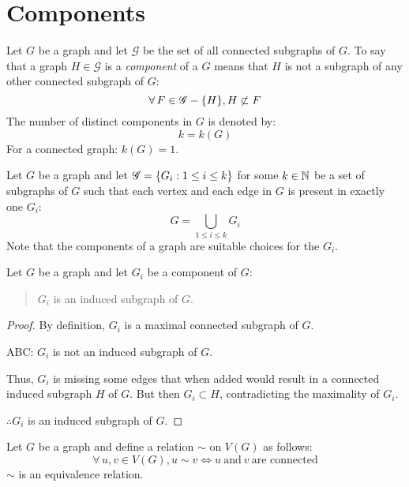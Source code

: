 \documentclass[letterpaper,12pt,fleqn]{article}
\newcommand{\G}{\mathscr{G}}
\begin{document}
\section*{Components}

\begin{definition}[Component]
  Let \(G\) be a graph and let \(\G\) be the set of all connected subgraphs of \(G\).  To say that a graph \(H\in\G\)
  is a \emph{component} of a \(G\) means that \(H\) is not a subgraph of any other connected subgraph of \(G\):
  \[\forall\,F\in\G-\set{H},H\not\subset F\]
  The number of distinct components in \(G\) is denoted by:
  \[k=k(G)\]
  For a connected graph: \(k(G)=1\).
\end{definition}

\begin{notation}[Union]
  Let \(G\) be a graph and let \(\G=\set{G_i:1\le i\le k}\) for some \(k\in\mathbb{N}\) be a set of subgraphs of \(G\) such
  that each vertex and each edge in \(G\) is present in exactly one \(G_i\):
  \[G=\bigcup_{1\le i\le k}G_i\]
  Note that the components of a graph are suitable choices for the \(G_i\).
\end{notation}

\begin{lemma}
  Let \(G\) be a graph and let \(G_i\) be a component of \(G\):
  \begin{quote}
    \(G_i\) is an induced subgraph of \(G\).
  \end{quote}
\end{lemma}

\begin{proof}
  By definition, \(G_i\) is a maximal connected subgraph of \(G\).

  ABC: \(G_i\) is not an induced subgraph of \(G\).

  Thus, \(G_i\) is missing some edges that when added would result in a connected induced subgraph \(H\) of \(G\).
  But then \(G_i\subset H\), contradicting the maximality of \(G_i\).

  \(\therefore G_i\) is an induced subgraph of \(G\).
\end{proof}

\begin{theorem}
  Let \(G\) be a graph and define a relation \(\sim\) on \(V(G)\) as follows:
  \[\forall\,u,v\in V(G),u\sim v\iff u\ \text{and}\ v\ \text{are connected}\]
  \(\sim\) is an equivalence relation.
\end{theorem}
\end{document}
